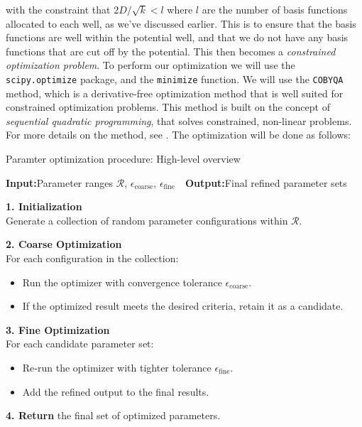 \documentclass{subfiles}
\begin{document}
with the constraint that $2D / \sqrt{k} < l$ where $l$ are the number of basis functions allocated to each well, as we've discussed earlier. This is to ensure that the basis functions are well within the potential well, and that we do not have any basis functions that are cut off by the potential. This then becomes a \emph{constrained optimization problem}. To perform our optimization we will use the \texttt{scipy.optimize} package, and the \texttt{minimize} function. We will use the \texttt{COBYQA} method, which is a derivative-free optimization method that is well suited for constrained optimization problems. This method is built on the concept of \emph{sequential quadratic programming}, that solves constrained, non-linear problems. For more details on the method, see \cite{razh_cobyqa}. The optimization will be done as follows:
\begin{algorithm}[ht]
\caption{Paramter optimization procedure: High-level overview}
\textbf{Input:}{Parameter ranges \(\mathcal{R}\), \(\epsilon_{\text{coarse}}\), \(\epsilon_{\text{fine}}\)}
\,\,\,\,\textbf{Output:}{Final refined parameter sets}

\textbf{1. Initialization}\\
Generate a collection of random parameter configurations within \(\mathcal{R}\).

\textbf{2. Coarse Optimization}\\
For each configuration in the collection:
\begin{itemize}
  \item Run the optimizer with convergence tolerance \(\epsilon_{\text{coarse}}\).
  \item If the optimized result meets the desired criteria, retain it as a candidate.
\end{itemize}

\textbf{3. Fine Optimization}\\
For each candidate parameter set:
\begin{itemize}
  \item Re‐run the optimizer with tighter tolerance \(\epsilon_{\text{fine}}\).
  \item Add the refined output to the final results.
\end{itemize}

\textbf{4. Return} the final set of optimized parameters.
\end{algorithm}
\end{document}
